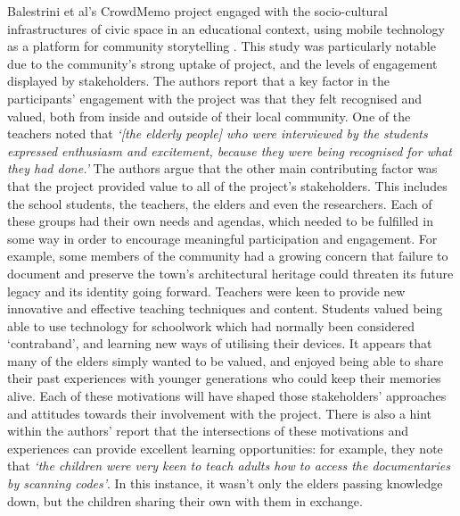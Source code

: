 Balestrini et al's CrowdMemo project engaged with the socio-cultural infrastructures of civic space in an educational context, using mobile technology as a platform for community storytelling \citep{Balestrini2014}. This study was particularly notable due to the community's strong uptake of project, and the levels of engagement displayed by stakeholders. The authors report that a key factor in the participants' engagement with the project was that they felt recognised and valued, both from inside and outside of their local community. One of the teachers noted that \textit{`[the elderly people] who were interviewed by the students expressed enthusiasm and excitement, because they were being recognised for what they had done.'} The authors argue that the other main contributing factor was that the project provided value to all of the project's stakeholders. This includes the school students, the teachers, the elders and even the researchers. Each of these groups had their own needs and agendas, which needed to be fulfilled in some way in order to encourage meaningful participation and engagement. For example, some members of the community had a growing concern that failure to document and preserve the town's architectural heritage could threaten its future legacy and its identity going forward. Teachers were keen to provide new innovative and effective teaching techniques and content. Students valued being able to use technology for schoolwork which had normally been considered `contraband', and learning new ways of utilising their devices. It appears that many of the elders simply wanted to be valued, and enjoyed being able to share their past experiences with younger generations who could keep their memories alive. Each of these motivations will have shaped those stakeholders' approaches and attitudes towards their involvement with the project. There is also a hint within the authors' report that the intersections of these motivations and experiences can provide excellent learning opportunities: for example, they note that \textit{`the children were very keen to teach adults how to access the documentaries by scanning codes'}. In this instance, it wasn't only the elders passing knowledge down, but the children sharing their own with them in exchange.

